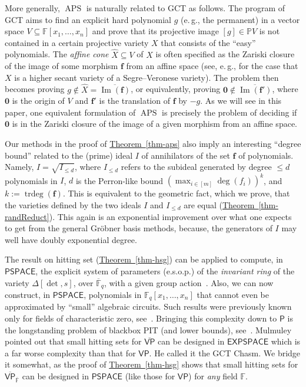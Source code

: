 \documentclass[11pt]{article}
\numberwithin{equation}{section}
\theoremstyle{definition}
\theoremstyle{plain}
\newcommand{\cclass}[1]{\textsf{#1}}
\newcommand{\eg}{e.\,g.}
\newcommand{\expref}[2]{\hyperref[#2]{#1~\ref{#2}}}
\newcommand{\F}{\mathbb{F}}
\newcommand{\proj}{\mathbb{P}}
\DeclareMathOperator{\im}{\mathrm{Im}}
\DeclareMathOperator{\trdeg}{\mathrm{trdeg}}
\newcommand{\ol}[1]{\overline{#1}}
\newcommand{\Pclass}{\cclass{P}\xspace}  %
\newcommand{\PSPACE}{\cclass{PSPACE}\xspace}  %
\newcommand{\EXPSPACE}{\cclass{EXPSPACE}\xspace} %
\newcommand{\VP}{\cclass{VP}\xspace}  %
\newcommand{\VPbar}{\overline{\VP}\xspace}  %
\DeclareMathOperator{\APS}{\mathrm{APS}\xspace} %
\begin{document}
More generally, $\APS$ is naturally related to GCT as
%
follows. The   %
program of GCT aims to find an explicit hard polynomial $g$ (\eg, the permanent) in a vector space $V\subseteq\mathbb{F}[x_1,\dots,x_n]$ and prove that its projective image $[g]\in\proj V$ is not contained in a certain projective variety $X$ that consists of  the ``easy'' polynomials.
The \emph{affine cone} $\hat{X}\subseteq V$ of $X$ is often specified as the Zariski closure of the image of some morphism $\mathbf{f}$  from an affine space (see, \eg, \cite[Section~2]{Rai12} for the case that $X$ is a higher secant variety of a Segre--Veronese variety). The problem then becomes proving $g\not\in \hat{X}=\overline{\im(\mathbf{f})}$, or equivalently, proving $\mathbf{0}\not\in \overline{\im(\mathbf{f}')}$, where $\mathbf{0}$ is the origin of $V$ and $\mathbf{f}'$ is the translation of $\mathbf{f}$ by $-g$. As we will see in this paper, one equivalent formulation of $\APS$ is precisely the problem of deciding if $\mathbf{0}$ is in the Zariski closure of the image of a given morphism from an affine space. 


Our methods in the proof of \expref{Theorem}{thm-aps} also imply an interesting ``degree bound'' related to the (prime) ideal $I$ of annihilators of
%
the set $\mathbf f$ of polynomials.  %
Namely, $I=\sqrt{I_{\le d}}$, where $I_{\le d}$ refers to the subideal generated by degree $\le d$ polynomials
%
in    %
$I$, $d$ is the Perron-like bound $(\max_{i\in [m]}\deg(f_i))^k$, and $k:= \trdeg(\mathbf f)$. This is equivalent to the geometric fact, which we prove, that the varieties defined by the two ideals $I$ and $I_{\le d}$ are equal (\expref{Theorem}{thm-randReduct}). This again is an exponential improvement over what one expects to get from the general Gr\"obner basis
methods, %
because, the generators of $I$ may well have
%
doubly exponential   %
degree.

The result on hitting set (\expref{Theorem}{thm-hsg}) can be applied to compute, in $\PSPACE$, the explicit system of parameters (e.s.o.p.) of the \emph{invariant ring} of the variety $\Delta[\det,s]$, over $\ol{\F}_q$, with a given group action~\cite[Theorem~4.9]{mulmuley2017geometric}. Also, we can now construct, in $\PSPACE$, polynomials in $\F_q[x_1,\dots,x_n]$ that cannot even be approximated by ``small'' algebraic circuits. Such results were previously known only for
%
fields of characteristic zero,  %
see~\cite[Theorems~1.1--1.4]{forbes2017pspace}. Bringing this complexity down to 
%
$\Pclass$  %
is the longstanding problem of blackbox PIT
%
(and lower bounds),  %
see~\cite{Saxena09, shpilka2010arithmetic, Saxena14}. Mulmuley~\cite{mul12} pointed out that small hitting sets for 
%
$\VPbar$ %
can be designed in
%
$\EXPSPACE$
which is a far worse complexity than that for 
%
$\VP$. %
He called it the GCT Chasm. We bridge it somewhat, as the proof of \expref{Theorem}{thm-hsg} shows that small hitting sets for 
%
$\VPbar_{\ol{\F}}$ %
can be designed in $\PSPACE$ (like those for 
%
$\VP$) %
for \emph{any} field $\F$.
\end{document}
